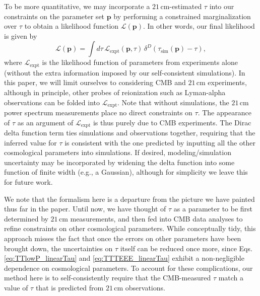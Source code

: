 \documentclass[twocolumn,aps,prd,nofootinbib,showpacs]{revtex4-1}
\begin{document}
To be more quantitative, we may incorporate a $21\,\textrm{cm}$-estimated $\tau$ into our constraints on the parameter set $\mathbf{p}$ by performing a constrained marginalization over $\tau$ to obtain a likelihood function $\mathcal{L} (\mathbf{p})$. In other words, our final likelihood is given by
\begin{equation}
\label{eq:ConstrainedOptimization}
\mathcal{L} (\mathbf{p}) = \int d\tau \, \mathcal{L}_\textrm{expt} ( \mathbf{p}, \tau) \, \delta^D \!\!\left( \tau_\textrm{sim} (\mathbf{p}) - \tau \right),
\end{equation}
where $\mathcal{L}_\textrm{expt}$ is the likelihood function of parameters from experiments alone (without the extra information imposed by our self-consistent simulations). In this paper, we will limit ourselves to considering CMB and $21\,\textrm{cm}$ experiments, although in principle, other probes of reionization such as Lyman-alpha observations can be folded into $\mathcal{L}_\textrm{expt}$. Note that without simulations, the $21\,\textrm{cm}$ power spectrum measurements place no direct constraints on $\tau$. The appearance of $\tau$ as an argument of $\mathcal{L}_\textrm{expt}$ is thus purely due to CMB experiments. The Dirac delta function term ties simulations and observations together, requiring that the inferred value for $\tau$ is consistent with the one predicted by inputting all the other cosmological parameters into simulations. If desired, modeling/simulation uncertainty may be incorporated by widening the delta function into some function of finite width (e.g., a Gaussian), although for simplicity we leave this for future work.

We note that the formalism here is a departure from the picture we have painted thus far in the paper. Until now, we have thought of $\tau$ as a parameter to be first determined by $21\,\textrm{cm}$ measurements, and then fed into CMB data analyses to refine constraints on other cosmological parameters. While conceptually tidy, this approach misses the fact that once the errors on other parameters have been brought down, the uncertainties on $\tau$ itself can be reduced once more, since Eqs. \eqref{eq:TTlowP_linearTau} and \eqref{eq:TTTEEE_linearTau} exhibit a non-negligible dependence on cosmological parameters. To account for these complications, our method here is to self-consistently require that the CMB-measured $\tau$ match a value of $\tau$ that is predicted from $21\,\textrm{cm}$ observations.
\end{document}

